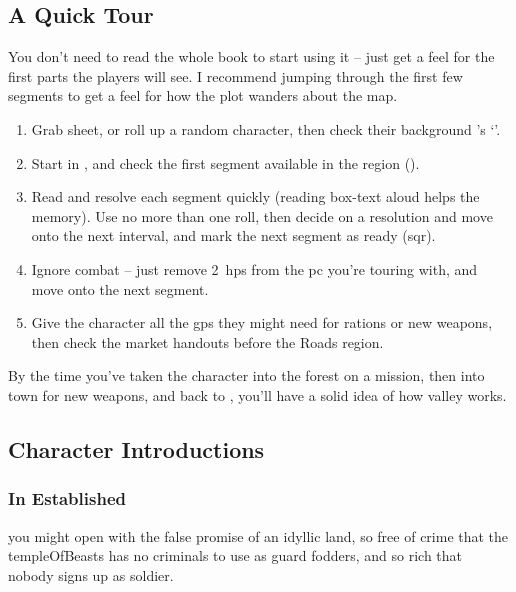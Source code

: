 \begin{multicols}{2}

\subsection{A Quick Tour}

You don't need to read the whole book to start using it -- just get a feel for the first parts the players will see.
I recommend jumping through the first few \glspl{segment} to get a feel for how the plot wanders about the map.

\begin{enumerate}
  \item
  Grab  sheet, or roll up a random character, then check their background 's `'.
  \item
  Start in  , and check the first \gls{segment} available in the \gls{region} ().
  \item
  Read and resolve each \gls{segment} quickly (reading box-text aloud helps the memory).
  Use no more than one roll, then decide on a resolution and move onto the next \gls{interval}, and mark the next \gls{segment} as ready (\gls{sqr}).
  \item
  Ignore combat -- just remove 2~\glspl{hp} from the \gls{pc} you're touring with, and move onto the next \gls{segment}.
  \item
  Give the character all the \glspl{gp} they might need for \glspl{ration} or new \glspl{weapon}, then check the market handouts before the Roads \gls{region}.
\end{enumerate}

By the time you've taken the character into the forest on a mission, then into \gls{town} for new weapons, and back to , you'll have a solid idea of how \gls{valley} works.

\subsection{Character Introductions}
\label{greyBackgrounds}

\subsubsection{In Established }
you might open with the false promise of an idyllic land, so free of crime that the \gls{templeOfBeasts} has no criminals to use as \gls{guard} \glspl{fodder}, and so rich that nobody signs up as  \gls{soldier}.


\end{multicols}
